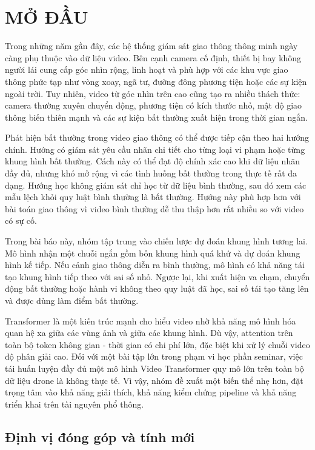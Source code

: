 \section{MỞ ĐẦU}

Trong những năm gần đây, các hệ thống giám sát giao thông thông minh ngày càng phụ thuộc vào dữ liệu video. Bên cạnh camera cố định, thiết bị bay không người lái cung cấp góc nhìn rộng, linh hoạt và phù hợp với các khu vực giao thông phức tạp như vòng xoay, ngã tư, đường đông phương tiện hoặc các sự kiện ngoài trời. Tuy nhiên, video từ góc nhìn trên cao cũng tạo ra nhiều thách thức: camera thường xuyên chuyển động, phương tiện có kích thước nhỏ, mật độ giao thông biến thiên mạnh và các sự kiện bất thường xuất hiện trong thời gian ngắn.

Phát hiện bất thường trong video giao thông có thể được tiếp cận theo hai hướng chính. Hướng có giám sát yêu cầu nhãn chi tiết cho từng loại vi phạm hoặc từng khung hình bất thường. Cách này có thể đạt độ chính xác cao khi dữ liệu nhãn đầy đủ, nhưng khó mở rộng vì các tình huống bất thường trong thực tế rất đa dạng. Hướng học không giám sát chỉ học từ dữ liệu bình thường, sau đó xem các mẫu lệch khỏi quy luật bình thường là bất thường. Hướng này phù hợp hơn với bài toán giao thông vì video bình thường dễ thu thập hơn rất nhiều so với video có sự cố.

Trong bài báo này, nhóm tập trung vào chiến lược dự đoán khung hình tương lai. Mô hình nhận một chuỗi ngắn gồm bốn khung hình quá khứ và dự đoán khung hình kế tiếp. Nếu cảnh giao thông diễn ra bình thường, mô hình có khả năng tái tạo khung hình tiếp theo với sai số nhỏ. Ngược lại, khi xuất hiện va chạm, chuyển động bất thường hoặc hành vi không theo quy luật đã học, sai số tái tạo tăng lên và được dùng làm điểm bất thường.

Transformer là một kiến trúc mạnh cho hiểu video nhờ khả năng mô hình hóa quan hệ xa giữa các vùng ảnh và giữa các khung hình. Dù vậy, attention trên toàn bộ token không gian - thời gian có chi phí lớn, đặc biệt khi xử lý chuỗi video độ phân giải cao. Đối với một bài tập lớn trong phạm vi học phần seminar, việc tái huấn luyện đầy đủ một mô hình Video Transformer quy mô lớn trên toàn bộ dữ liệu drone là không thực tế. Vì vậy, nhóm đề xuất một biến thể nhẹ hơn, đặt trọng tâm vào khả năng giải thích, khả năng kiểm chứng pipeline và khả năng triển khai trên tài nguyên phổ thông.

\subsection{Định vị đóng góp và tính mới}


